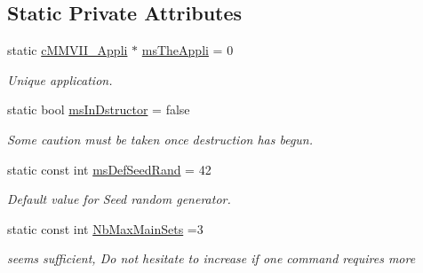 \subsection*{Static Private Attributes}
\begin{DoxyCompactItemize}
\item 
static \hyperlink{classMMVII_1_1cMMVII__Appli}{c\+M\+M\+V\+I\+I\+\_\+\+Appli} $\ast$ \hyperlink{classMMVII_1_1cMMVII__Appli_ad2cee4f236229daed712c7d4353ee28f}{ms\+The\+Appli} = 0\hypertarget{classMMVII_1_1cMMVII__Appli_ad2cee4f236229daed712c7d4353ee28f}{}\label{classMMVII_1_1cMMVII__Appli_ad2cee4f236229daed712c7d4353ee28f}

\begin{DoxyCompactList}\small\item\em Unique application. \end{DoxyCompactList}\item 
static bool \hyperlink{classMMVII_1_1cMMVII__Appli_a281160622e37dd3e6ca88c9167a3d84d}{ms\+In\+Dstructor} = false\hypertarget{classMMVII_1_1cMMVII__Appli_a281160622e37dd3e6ca88c9167a3d84d}{}\label{classMMVII_1_1cMMVII__Appli_a281160622e37dd3e6ca88c9167a3d84d}

\begin{DoxyCompactList}\small\item\em Some caution must be taken once destruction has begun. \end{DoxyCompactList}\item 
static const int \hyperlink{classMMVII_1_1cMMVII__Appli_a3788227d437de352fd96beb5fb111352}{ms\+Def\+Seed\+Rand} = 42\hypertarget{classMMVII_1_1cMMVII__Appli_a3788227d437de352fd96beb5fb111352}{}\label{classMMVII_1_1cMMVII__Appli_a3788227d437de352fd96beb5fb111352}

\begin{DoxyCompactList}\small\item\em Default value for Seed random generator. \end{DoxyCompactList}\item 
static const int \hyperlink{classMMVII_1_1cMMVII__Appli_a819abde678fbc53402c9bc10ba8ef7f4}{Nb\+Max\+Main\+Sets} =3\hypertarget{classMMVII_1_1cMMVII__Appli_a819abde678fbc53402c9bc10ba8ef7f4}{}\label{classMMVII_1_1cMMVII__Appli_a819abde678fbc53402c9bc10ba8ef7f4}

\begin{DoxyCompactList}\small\item\em seems sufficient, Do not hesitate to increase if one command requires more \end{DoxyCompactList}\end{DoxyCompactItemize}
